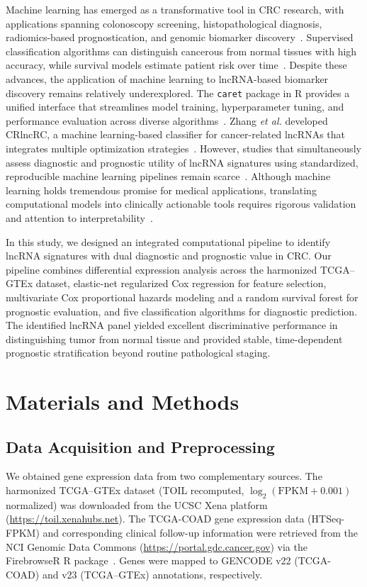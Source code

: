 \documentclass[12pt,a4paper]{article}
\begin{document}
Machine learning has emerged as a transformative tool in CRC research, with applications spanning colonoscopy screening, histopathological diagnosis, radiomics-based prognostication, and genomic biomarker discovery~\cite{ref12}. Supervised classification algorithms can distinguish cancerous from normal tissues with high accuracy, while survival models estimate patient risk over time~\cite{ref13,ref14}. Despite these advances, the application of machine learning to lncRNA-based biomarker discovery remains relatively underexplored. The \texttt{caret} package in R provides a unified interface that streamlines model training, hyperparameter tuning, and performance evaluation across diverse algorithms~\cite{ref15}. Zhang \textit{et al.} developed CRlncRC, a machine learning-based classifier for cancer-related lncRNAs that integrates multiple optimization strategies~\cite{ref16}. However, studies that simultaneously assess diagnostic and prognostic utility of lncRNA signatures using standardized, reproducible machine learning pipelines remain scarce~\cite{ref17}. Although machine learning holds tremendous promise for medical applications, translating computational models into clinically actionable tools requires rigorous validation and attention to interpretability~\cite{ref18}.

In this study, we designed an integrated computational pipeline to identify lncRNA signatures with dual diagnostic and prognostic value in CRC. Our pipeline combines differential expression analysis across the harmonized TCGA--GTEx dataset, elastic-net regularized Cox regression for feature selection, multivariate Cox proportional hazards modeling and a random survival forest for prognostic evaluation, and five classification algorithms for diagnostic prediction. The identified lncRNA panel yielded excellent discriminative performance in distinguishing tumor from normal tissue and provided stable, time-dependent prognostic stratification beyond routine pathological staging.

\section{Materials and Methods}

\subsection{Data Acquisition and Preprocessing}

We obtained gene expression data from two complementary sources. The harmonized TCGA--GTEx dataset (TOIL recomputed, $\log_2(\text{FPKM}+0.001)$ normalized) was downloaded from the UCSC Xena platform (\url{https://toil.xenahubs.net}). The TCGA-COAD gene expression data (HTSeq-FPKM) and corresponding clinical follow-up information were retrieved from the NCI Genomic Data Commons (\url{https://portal.gdc.cancer.gov}) via the FirebrowseR R package~\cite{ref19}. Genes were mapped to GENCODE v22 (TCGA-COAD) and v23 (TCGA--GTEx) annotations, respectively.
\end{document}
